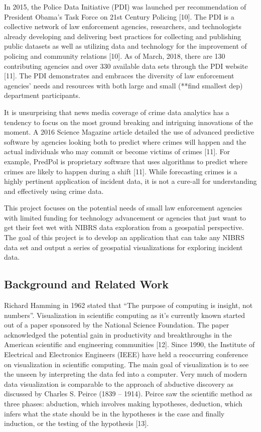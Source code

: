 \documentclass[runningheads]{llncs}
\begin{document}
In 2015, the Police Data Initiative (PDI) was launched per recommendation of President Obama’s Task Force on 21st Century Policing [10]. The PDI is a collective network of law enforcement agencies, researchers, and technologists already developing and delivering best practices for collecting and publishing public datasets as well as utilizing data and technology for the improvement of policing and community relations [10]. As of March, 2018, there are 130 contributing agencies and over 330 available data sets through the PDI website [11]. The PDI demonstrates and embraces the diversity of law enforcement agencies’ needs and resources with both large and small (**find smallest dep) department participants.

It is unsurprising that news media coverage of crime data analytics has a tendency to focus on the most ground breaking and intriguing innovations of the moment. A 2016 Science Magazine article detailed the use of advanced predictive software by agencies looking both to predict where crimes will happen and the actual individuals who may commit or become victims of crimes [11]. For example, PredPol is proprietary software that uses algorithms to predict where crimes are likely to happen during a shift [11]. While forecasting crimes is a highly pertinent application of incident data, it is not a cure-all for understanding and effectively using crime data. 

This project focuses on the potential needs of small law enforcement agencies with limited funding for technology advancement or agencies that just want to get their feet wet with NIBRS data exploration from a geospatial perspective. The goal of this project is to develop an application that can take any NIBRS data set and output a series of geospatial visualizations for exploring incident data. 

\subsection{Background and Related Work}
Richard Hamming in 1962 stated that “The purpose of computing is insight, not numbers”. Visualization in scientific computing as it’s currently known started out of a paper sponsored by the National Science Foundation. The paper acknowledged the potential gain in productivity and breakthroughs in the American scientific and engineering communities [12]. Since 1990, the Institute of Electrical and Electronics Engineers (IEEE) have held a reoccurring conference on visualization in scientific computing. The main goal of visualization is to see the unseen by interpreting the data fed into a computer. Very much of modern data visualization is comparable to the approach of abductive discovery as discussed by Charles S. Peirce (1839 – 1914). Peirce saw the scientific method as three phases: abduction, which involves making hypotheses, deduction, which infers what the state should be in the hypotheses is the case and finally induction, or the testing of the hypothesis [13].
\end{document}
